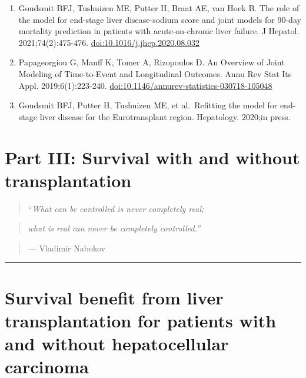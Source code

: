 \documentclass[11pt,english,]{book} %
\begin{document}
\begin{enumerate}
\item
  Goudsmit BFJ, Tushuizen ME, Putter H, Braat AE, van Hoek B. The role of the model for end-stage liver disease-sodium score and joint models for 90-day mortality prediction in patients with acute-on-chronic liver failure. J Hepatol. 2021;74(2):475-476. \url{doi:10.1016/j.jhep.2020.08.032}
\item
  Papageorgiou G, Mauff K, Tomer A, Rizopoulos D. An Overview of Joint Modeling of Time-to-Event and Longitudinal Outcomes. Annu Rev Stat Its Appl. 2019;6(1):223-240. \url{doi:10.1146/annurev-statistics-030718-105048}
\item
  Goudsmit BFJ, Putter H, Tushuizen ME, et al.~Refitting the model for end-stage liver disease for the Eurotransplant region. Hepatology. 2020;in press.
\end{enumerate}

\newpage
\linespread{1.213}
\normalsize
\thispagestyle{plain}

\mbox{}

\pagecolor{black}
\color{white}

\hypertarget{part-iii-survival-with-and-without-transplantation}{%
\chapter*{Part III: Survival with and without transplantation}\label{part-iii-survival-with-and-without-transplantation}}

\begin{quote}
``\emph{What can be controlled is never completely real;}
\end{quote}

\begin{quote}
\emph{what is real can never be completely controlled.''}
\end{quote}

\begin{quote}
--- Vladimir Nabokov
\end{quote}

\begin{center}\rule{0.5\linewidth}{0.5pt}\end{center}

\newpage

\hypertarget{chap-benefit}{%
\chapter{Survival benefit from liver transplantation for patients with and without hepatocellular carcinoma}\label{chap-benefit}}
\end{document}
